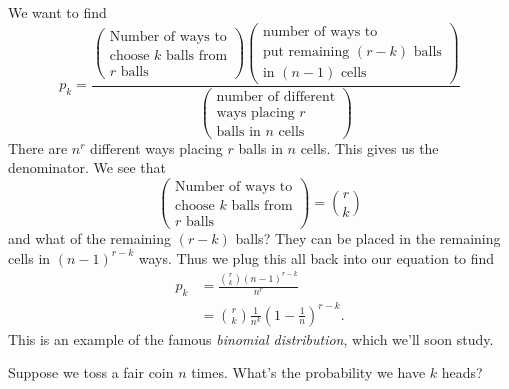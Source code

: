 We want to find
\begin{equation}
p_{k} = \frac{\begin{pmatrix}
    \mbox{Number of ways to}\\
    \mbox{choose $k$ balls from}\\
    \mbox{$r$ balls}
  \end{pmatrix}
\begin{pmatrix}
  \mbox{number of ways to}\\
  \mbox{put remaining $(r-k)$ balls}\\
  \mbox{in $(n-1)$ cells}
\end{pmatrix}}{\begin{pmatrix}\mbox{number of different}\\
\mbox{ways placing $r$}\\
\mbox{balls in $n$ cells}
  \end{pmatrix}}
\end{equation}
There are $n^{r}$ different ways placing $r$ balls in $n$ cells. This
gives us the denominator. We see that
\begin{equation}
\begin{pmatrix}
    \mbox{Number of ways to}\\
    \mbox{choose $k$ balls from}\\
    \mbox{$r$ balls}
  \end{pmatrix} = \binom{r}{k}
\end{equation}
and what of the remaining $(r-k)$ balls? They can be placed in the
remaining cells in $(n-1)^{r-k}$ ways. Thus we plug this all back into
our equation to find
\begin{equation}
\begin{split}
p_{k}&=\frac{\displaystyle\binom{r}{k}(n-1)^{r-k}}{n^{r}}\\
&=\binom{r}{k}\frac{1}{n^{k}}\left(1-\frac{1}{n}\right)^{r-k}.
\end{split}
\end{equation}
This is an example of the famous \emph{binomial distribution}, which
we'll soon study.

Suppose we toss a fair coin $n$ times. What's the probability we have
$k$ heads? 

